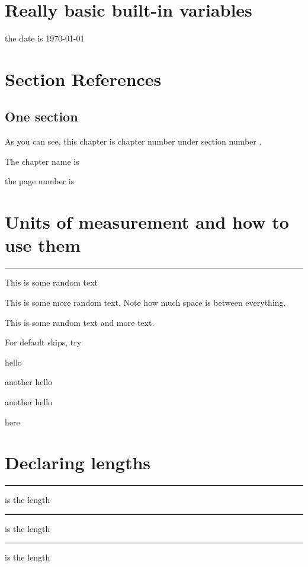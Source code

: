 \documentclass[12pt]{report}
\begin{document}
\chapter{Really basic built-in variables}
the date is \today 


\chapter{Section References}
\section{One section}

As you can see, this chapter is chapter number \thechapter under section number \thesection. %

The chapter name is \chaptername 

the page number is \thepage 

\pagebreak 
\chapter{Units of measurement and how to use them}

\rule[0pt]{5cm}{2mm} %

This is some random text 

\vspace{2cm}

This is some more random text. Note how much space is between everything. 

\vspace{3cm}
This is some random text \hspace{2cm} and more text.

For default skips, try 

hello 
\smallskip

another hello 
\medskip

another hello 
\bigskip 

here

\chapter{Declaring lengths}
\newlength{\mylength}
\setlength{\mylength}{4mm}

\rule[0pt]{\mylength}{2pt}

\the\mylength is the length 

\addtolength{\mylength}{2mm}

\rule[0pt]{\mylength}{2pt}

\the\mylength is the length 

\setlength{\mylength}{2mm plus 2mm minus 1mm} %

\rule[0pt]{\mylength}{2pt}

\the\mylength is the length 
\end{document}
